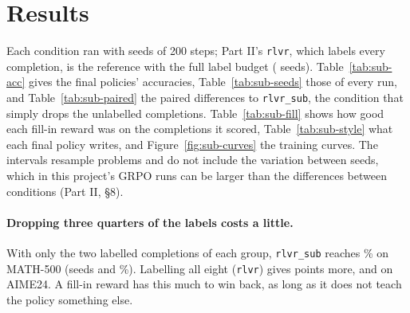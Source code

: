 
\section{Results}\label{sec:res}

Each condition ran with  seeds of 200 steps; Part II's \texttt{rlvr}, which labels every completion,
is the reference with the full label budget ( seeds). Table~\ref{tab:sub-acc} gives the final policies'
accuracies, Table~\ref{tab:sub-seeds} those of every run, and Table~\ref{tab:sub-paired} the paired differences to
\texttt{rlvr\_sub}, the condition that simply drops the unlabelled completions. Table~\ref{tab:sub-fill} shows how good
each fill-in reward was on the completions it scored, Table~\ref{tab:sub-style} what each final policy writes, and
Figure~\ref{fig:sub-curves} the training curves. The intervals resample problems and do not include the variation
between seeds, which in this project's GRPO runs can be larger than the differences between conditions (Part II, \S8).

\begin{table}[t]
\centering\small

\caption{Final policies: accuracy in percent, seed mean $\pm$ standard deviation over seeds. MATH-500 and GSM8K: greedy.
AMC23, AIME24 and AIME25: mean over 16 samples per problem at temperature 0.6. \texttt{rlvr}: every completion labelled
(Part II); the other conditions label 2 of the 8 completions of each group.}
\label{tab:sub-acc}
\end{table}

\begin{table}[t]
\centering\small

\caption{The final policy of every run: accuracy in percent, as in Table~\ref{tab:sub-acc}.}
\label{tab:sub-seeds}
\end{table}

\paragraph{Dropping three quarters of the labels costs a little.} With only the two labelled completions of each group,
\texttt{rlvr\_sub} reaches \% on MATH-500 (seeds  and \%).
Labelling all eight (\texttt{rlvr}) gives   points more,
and   on AIME24. A fill-in reward has this much to
win back, as long as it does not teach the policy something else.


